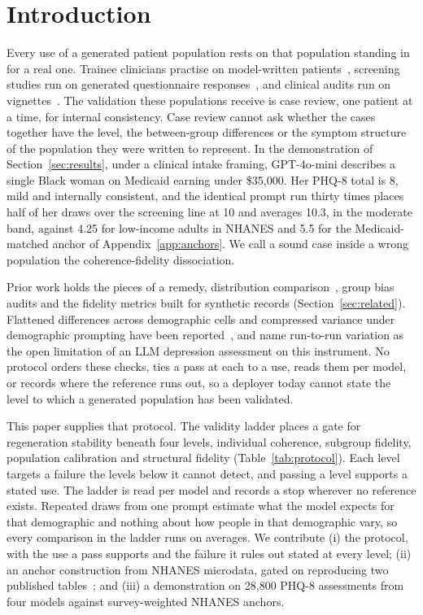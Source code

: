 \documentclass[wcp]{jmlr}
\let\cite\citep
\begin{document}
\section{Introduction}

Every use of a generated patient population rests on that population standing in for a real one. Trainee clinicians practise on model-written patients~\cite{wang2024patientpsi}, screening studies run on generated questionnaire responses~\cite{villarrealzegarra2026synthetic}, and clinical audits run on vignettes~\cite{zack2024gpt4,pfohl2024toolbox}. The validation these populations receive is case review, one patient at a time, for internal consistency. Case review cannot ask whether the cases together have the level, the between-group differences or the symptom structure of the population they were written to represent. In the demonstration of Section~\ref{sec:results}, under a clinical intake framing, GPT-4o-mini describes a single Black woman on Medicaid earning under \$35,000. Her PHQ-8 total is 8, mild and internally consistent, and the identical prompt run thirty times places half of her draws over the screening line at 10 and averages 10.3, in the moderate band, against 4.25 for low-income adults in NHANES and 5.5 for the Medicaid-matched anchor of Appendix~\ref{app:anchors}. We call a sound case inside a wrong population the coherence-fidelity dissociation.

Prior work holds the pieces of a remedy, distribution comparison~\cite{bisbee2024synthetic}, group bias audits and the fidelity metrics built for synthetic records (Section~\ref{sec:related}). Flattened differences across demographic cells and compressed variance under demographic prompting have been reported~\cite{yu2025surveys,zhang2025twins}, and \citet{greene2026psychiatrist} name run-to-run variation as the open limitation of an LLM depression assessment on this instrument. No protocol orders these checks, ties a pass at each to a use, reads them per model, or records where the reference runs out, so a deployer today cannot state the level to which a generated population has been validated.

This paper supplies that protocol. The validity ladder places a gate for regeneration stability beneath four levels, individual coherence, subgroup fidelity, population calibration and structural fidelity (Table~\ref{tab:protocol}). Each level targets a failure the levels below it cannot detect, and passing a level supports a stated use. The ladder is read per model and records a stop wherever no reference exists. Repeated draws from one prompt estimate what the model expects for that demographic and nothing about how people in that demographic vary, so every comparison in the ladder runs on averages. We contribute (i) the protocol, with the use a pass supports and the failure it rules out stated at every level; (ii) an anchor construction from NHANES microdata, gated on reproducing two published tables~\cite{brody2018depression,patel2019phq9}; and (iii) a demonstration on 28,800 PHQ-8 assessments from four models against survey-weighted NHANES anchors.
\end{document}

